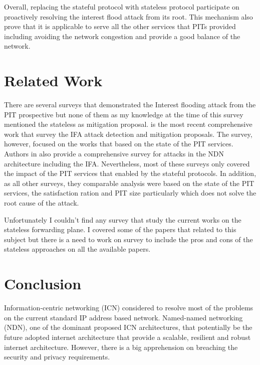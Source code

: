 \documentclass[conference]{IEEEtran}
\begin{document}
Overall, replacing the stateful protocol with stateless protocol participate on proactively  resolving the interest flood attack from its root. This mechanism also prove that it is applicable to serve all the other services that PITs provided including avoiding the network congestion and provide a good balance of the network.  

\section{Related Work}
There are several surveys that demonstrated the Interest flooding attack from the PIT prospective but none of them as my knowledge at the time of this survey mentioned the stateless as mitigation proposal. \cite{rai2018survey} is the most recent comprehensive work that survey the IFA attack detection and mitigation proposals. The survey, however, focused on the works that based on the state of the PIT services. Authors in \cite{Tourani2018}\cite{Chhetry2016}\cite{Chen2015}
\cite{Ahlgren2012} also provide a comprehensive survey for attacks in the NDN architecture including the IFA. Nevertheless, most of these surveys only covered the impact of the PIT services that enabled by the stateful protocols. In addition, as all other surveys, they comparable analysis were based on the state of the PIT services, the satisfaction ration and PIT size particularly which does not solve the root cause of the attack.


Unfortunately  I couldn't find any survey that study the current works on the stateless forwarding plane. I covered some of the papers that related to this subject but there is a need to work on survey to include the pros and cons  of the stateless approaches on all the available papers. 

\section{Conclusion}
Information-centric networking (ICN) considered to resolve most of the problems on the current standard IP address based network. Named-named networking (NDN), one of the dominant proposed ICN architectures, that potentially be the future adopted internet architecture that provide a scalable, resilient and robust internet architecture. However, there is a big apprehension on breaching the security and privacy requirements. 
\end{document}
